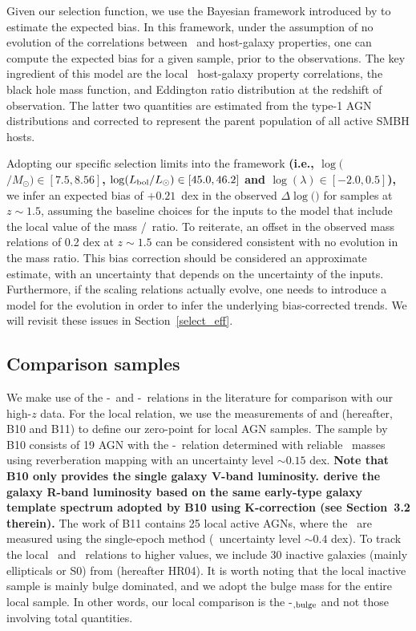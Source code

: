 \documentclass[apj]{emulateapj}
\begin{document}
Given our selection function, we use the Bayesian framework introduced by \citet{Schulze2011,Schulze2014} to estimate the expected bias. In this framework, under the assumption of no evolution of the correlations between \mbh\ and host-galaxy properties, one can compute the expected bias for a given sample, prior to the observations. The key ingredient of this model are the local \mbh\ host-galaxy property correlations, the black hole mass function, and Eddington ratio distribution at the redshift of observation. The latter two quantities are estimated from the type-1 AGN distributions \citep{Schulze2015} and corrected to represent the parent population of all active SMBH hosts. %

Adopting our specific selection limits into the framework {\bf (i.e., $\log($\mbh$/M_{\odot})\in[7.5, 8.56]$, $\log(L_{\rm bol}/L_{\odot})\in[45.0, 46.2] $ and  $\log(\lambda) \in [-2.0, 0.5]$),} we infer an expected bias of $+0.21$~dex in the observed $\Delta\log($\mbh$)$ for samples at $z\sim1.5$, assuming the baseline choices for the inputs to the model that include the local value of the mass \mbh/\smass ~ratio. To reiterate, an offset in the observed mass relations of 0.2 dex at $z\sim1.5$ can be considered consistent with no evolution in the mass ratio. This bias correction should be considered an approximate estimate, with an uncertainty that depends on the uncertainty of the inputs. Furthermore, if the scaling relations actually evolve, one needs to introduce a model for the evolution in order to infer the underlying bias-corrected trends. We will revisit these issues in Section~\ref{select_eff}.

\subsection{Comparison samples}\label{sec:compare_sample}

We make use of the \mbh-\lhost\ and \mbh-\smass\ relations in the literature for comparison with our high-$z$ data. For the local relation, we use the measurements of \citet{Ben++10} and \citet{Bennert++2011} (hereafter, B10 and B11) to define our zero-point for local AGN samples. The sample by B10 consists of 19 AGN with the \mbh-\lhost\ relation determined with reliable \mbh\ masses using reverberation mapping with an uncertainty level $\sim0.15$ dex. {\bf Note that B10 only provides the single galaxy V-band luminosity. \citet{Ding2017b} derive the galaxy R-band luminosity based on the same early-type galaxy template spectrum adopted by B10 using K-correction (see Section~3.2 therein).} The work of B11 contains 25 local active AGNs, where the \mbh\ are measured using the single-epoch method (\mbh\ uncertainty level $\sim0.4$ dex). To track the local \smass\ and \mbh\  relations to higher values, we include 30 inactive galaxies (mainly ellipticals or S0) from \citet{H+R04} (hereafter HR04). It is worth noting that the local inactive sample is mainly bulge dominated, and we adopt the bulge mass for the entire local sample. In other words, our local comparison is the \mbh-\smass$_{\rm ,bulge}$ and not those involving total quantities.
\end{document}
